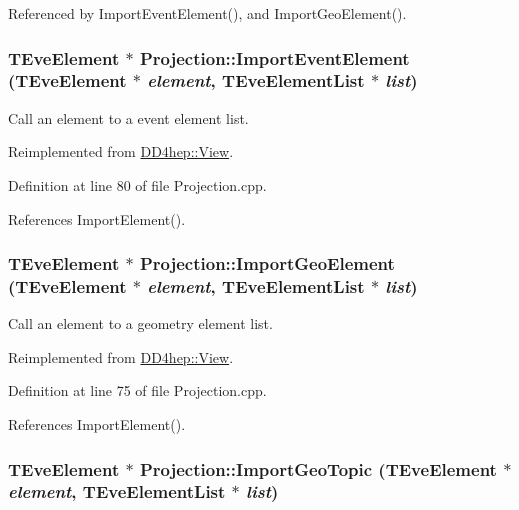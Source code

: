 Referenced by ImportEventElement(), and ImportGeoElement().\hypertarget{class_d_d4hep_1_1_projection_a63d20236b4b67710dcfb9904848465aa}{
\subsubsection[{ImportEventElement}]{\setlength{\rightskip}{0pt plus 5cm}TEveElement $\ast$ Projection::ImportEventElement (TEveElement $\ast$ {\em element}, \/  {\bf TEveElementList} $\ast$ {\em list})}}
\label{class_d_d4hep_1_1_projection_a63d20236b4b67710dcfb9904848465aa}


Call an element to a event element list. 

Reimplemented from \hyperlink{class_d_d4hep_1_1_view_acd696f9f50bda0d632cec822ab1f4672}{DD4hep::View}.

Definition at line 80 of file Projection.cpp.

References ImportElement().\hypertarget{class_d_d4hep_1_1_projection_a05c32084a42c00a366077acec5a55a82}{
\subsubsection[{ImportGeoElement}]{\setlength{\rightskip}{0pt plus 5cm}TEveElement $\ast$ Projection::ImportGeoElement (TEveElement $\ast$ {\em element}, \/  {\bf TEveElementList} $\ast$ {\em list})}}
\label{class_d_d4hep_1_1_projection_a05c32084a42c00a366077acec5a55a82}


Call an element to a geometry element list. 

Reimplemented from \hyperlink{class_d_d4hep_1_1_view_adc25ba7ece97c2f7c69f8fa6e0c13088}{DD4hep::View}.

Definition at line 75 of file Projection.cpp.

References ImportElement().\hypertarget{class_d_d4hep_1_1_projection_a97415addc63b3253bbccc3bcd0414c26}{
\subsubsection[{ImportGeoTopic}]{\setlength{\rightskip}{0pt plus 5cm}TEveElement $\ast$ Projection::ImportGeoTopic (TEveElement $\ast$ {\em element}, \/  {\bf TEveElementList} $\ast$ {\em list})}}
\label{class_d_d4hep_1_1_projection_a97415addc63b3253bbccc3bcd0414c26}


